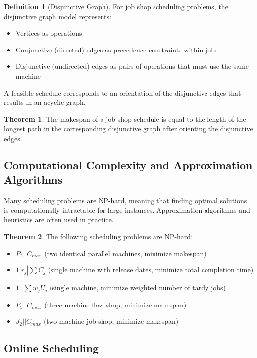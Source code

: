 \documentclass{article}
\theoremstyle{definition}
\newtheorem{theorem}{Theorem}
\newtheorem{definition}{Definition}
\begin{document}
\begin{definition}[Disjunctive Graph]
For job shop scheduling problems, the disjunctive graph model represents:
\begin{itemize}
    \item Vertices as operations
    \item Conjunctive (directed) edges as precedence constraints within jobs
    \item Disjunctive (undirected) edges as pairs of operations that must use the same machine
\end{itemize}
A feasible schedule corresponds to an orientation of the disjunctive edges that results in an acyclic graph.
\end{definition}

\begin{theorem}
The makespan of a job shop schedule is equal to the length of the longest path in the corresponding disjunctive graph after orienting the disjunctive edges.
\end{theorem}

\subsection*{Computational Complexity and Approximation Algorithms}

Many scheduling problems are NP-hard, meaning that finding optimal solutions is computationally intractable for large instances. Approximation algorithms and heuristics are often used in practice.

\begin{theorem}
The following scheduling problems are NP-hard:
\begin{itemize}
    \item $P_2||C_{max}$ (two identical parallel machines, minimize makespan)
    \item $1|r_j|\sum C_j$ (single machine with release dates, minimize total completion time)
    \item $1||\sum w_j U_j$ (single machine, minimize weighted number of tardy jobs)
    \item $F_3||C_{max}$ (three-machine flow shop, minimize makespan)
    \item $J_2||C_{max}$ (two-machine job shop, minimize makespan)
\end{itemize}
\end{theorem}

\subsection*{Online Scheduling}
\end{document}
